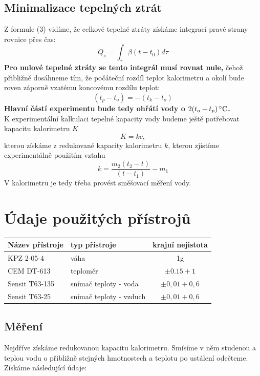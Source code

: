 \documentclass[czech,11pt,a4paper]{article}
\begin{document}
	\subsection{Minimalizace tepelných ztrát}
	Z formule (3) vidíme, že celkové tepelné ztráty získáme integrací pravé strany rovnice přes čas:
	\begin{equation}
		Q_s = \int_{\tau} \beta (t-t_0)d\tau
	\end{equation}
	\textbf{Pro nulové tepelné ztráty se tento integrál musí rovnat nule,} čehož přibližně dosáhneme tím, že počáteční rozdíl teplot kalorimetru a okolí bude roven záporně vzatému koncovému rozdílu teplot:
	\begin{equation}
		(t_p-t_o)= -(t_k-t_o)
	\end{equation}
\textbf{Hlavní částí experimentu bude tedy ohřátí vody o $2(t_o - t_p)\,\rm ^\circ C$.}\\
	K experimentální kalkulaci tepelné kapacity vody budeme ještě potřebovat kapacitu kalorimetru $K$ 
	\begin{equation}
		K = kc,
	\end{equation}
	kterou získáme z redukované kapacity kalorimetru $k$, kterou zjistíme experimentálně použitím vztahu
	\begin{equation}
		k = \frac {m_2 (t_2-t)}{(t-t_1)} - m_1
	\end{equation}
	V kalorimetru je tedy třeba provést směšovací měření vody.
	
	\section{Údaje použitých přístrojů}
	\begin{center}
		\begin{tabular}{|l|l|c|}
		\hline
		Název přístroje & typ přístroje           & krajní nejistota   \\ \hline \hline
		KPZ 2-05-4      & váha                    &   1g                          \\ \hline
		CEM DT-613      & teploměr                & $\pm 0.15 + 1  $ \\ \hline
		Sensit T63-135  & snímač teploty - voda   &$\pm 0,01 + 0,6 $\\ \hline
		Sensit T63-25   & snímač teploty - vzduch & $\pm 0,01 + 0,6$ \\ \hline
	\end{tabular}
	\end{center}
	
	\subsection{Měření}
	Nejdříve získáme redukovanou kapacitu kalorimetru. Smísíme v něm studenou a teplou vodu o přibližně stejných hmotnostech a teplotu po ustálení odečteme. Získáme následující údaje:
	
\end{document}
